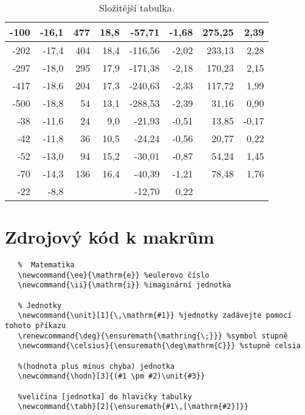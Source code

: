 \begin{table}[htbp]
\begin{tabular}{|r|r||r|r||r|r||r|r|}
	           -100 &          -16,1 &                  477 &          18,8 &          -57,71 &         -1,68 &               275,25 &                 2,39 \\ \hline
	           -202 &          -17,4 &                  404 &          18,4 &         -116,56 &         -2,02 &               233,13 &                 2,28 \\ \hline
	           -297 &          -18,0 &                  295 &          17,9 &         -171,38 &         -2,18 &               170,23 &                 2,15 \\ \hline
	           -417 &          -18,6 &                  204 &          17,3 &         -240,63 &         -2,33 &               117,72 &                 1,99 \\ \hline
	           -500 &          -18,8 &                   54 &          13,1 &         -288,53 &         -2,39 &                31,16 &                 0,90 \\ \hline
	            -38 &          -11,6 &                   24 &           9,0 &          -21,93 &         -0,51 &                13,85 &                -0,17 \\ \hline
	            -42 &          -11,8 &                   36 &          10,5 &          -24,24 &         -0,56 &                20,77 &                 0,22 \\ \hline
	            -52 &          -13,0 &                   94 &          15,2 &          -30,01 &         -0,87 &                54,24 &                 1,45 \\ \hline
	            -70 &          -14,3 &                  136 &          16,4 &          -40,39 &         -1,21 &                78,48 &                 1,76 \\ \hline
	            -22 &           -8,8 & \multicolumn{1}{r}{} &               &          -12,70 &          0,22 & \multicolumn{1}{r}{} & \multicolumn{1}{r}{} \\ \cline{1-2}\cline{5-6}
\end{tabular}
  \caption{Složitější tabulka.}
   \label{tab:data} 
\end{table}

\clearpage

   \section{Zdrojový kód k makrům}
   \label{sec:makra}
   \begin{verbatim}
   %  Matematika
   \newcommand{\ee}{\mathrm{e}} %eulerovo číslo
   \newcommand{\ii}{\mathrm{i}} %imaginární jednotka
   
   % Jednotky
   \newcommand{\unit}[1]{\,\mathrm{#1}} %jednotky zadávejte pomocí tohoto příkazu
   \renewcommand{\deg}{\ensuremath{\mathring{\;}}} %symbol stupně
   \newcommand{\celsius}{\ensuremath{\deg\mathrm{C}}} %stupně celsia
   
   %(hodnota plus mínus chyba) jednotka
   \newcommand{\hodn}[3]{(#1 \pm #2)\unit{#3}} 
   
   %veličina [jednotka] do hlavičky tabulky
   \newcommand{\tabh}[2]{\ensuremath{#1\,[\mathrm{#2}]}} 
   \end{verbatim}